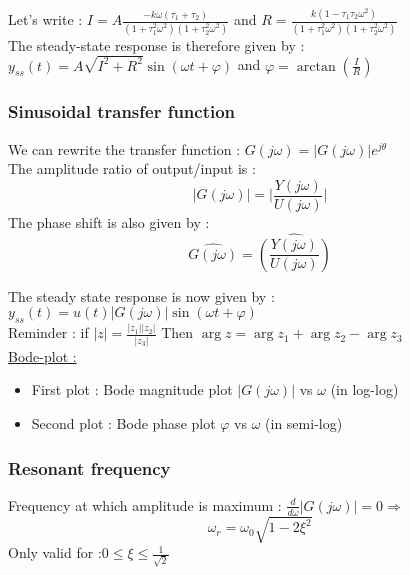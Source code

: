 \documentclass[../main.tex]{subfiles}
\begin{document}
Let's write : $I = A \frac{-k\omega (\tau_1+\tau_2)}{(1+\tau_1^2 \omega^2)(1+\tau_2^2 \omega^2)}$ and $R = \frac{k (1-\tau_1\tau_2 \omega^2)}{(1+\tau_1^2 \omega^2)(1+\tau_2^2 \omega^2)}$\\

The steady-state response is therefore given by : $y_{ss}(t) = A \sqrt{I^2+R^2} \sin(\omega t +\varphi)$ and $\varphi = \arctan(\frac{I}{R})$\\

\subsubsection{Sinusoidal transfer function}
We can rewrite the transfer function : $G(j\omega) = \lvert G(j\omega) \rvert e^{j\theta}$\\
The amplitude ratio of output/input is : \begin{equation}
    \lvert G(j\omega)\rvert = \lvert \frac{Y(j\omega)}{U(j\omega)}\rvert
\end{equation}
The phase shift is also given by : \begin{equation}
    \hat{G(j\omega)} = \hat{(\frac{Y(j\omega)}{U(j\omega)})}
\end{equation}

The steady state response is now given by : $y_{ss}(t) = u(t) \lvert G(j\omega)\rvert \sin(\omega t+\varphi)$\\

\color{gray} Reminder : if $\lvert z \rvert = \frac{\lvert z_1\rvert \lvert z_2\rvert}{\lvert z_3 \rvert}$ Then $\arg z = \arg z_1 + \arg z_2 - \arg z_3$ \color{black}\\
\quad \underline{Bode-plot :} \begin{itemize}
    \item First plot : Bode magnitude plot $\lvert G(j\omega)\rvert$ vs $\omega$ (in log-log)\\
    \item Second plot : Bode phase plot $\varphi$ vs $\omega$ (in semi-log)\\
\end{itemize}

\subsubsection{Resonant frequency}
Frequency at which amplitude is maximum : $\frac{d}{d\omega} \lvert G(j\omega)\rvert = 0 \Rightarrow$ \begin{equation}
    \omega_r = \omega_0 \sqrt{1-2\xi^2}
\end{equation}
\warning Only valid for :$0\leq \xi \leq \frac{1}{\sqrt{2}}$\\
\end{document}
